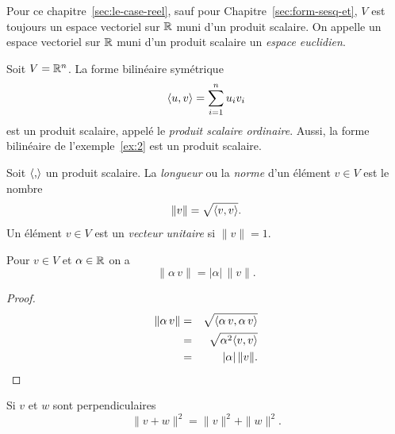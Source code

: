 \begin{framed}\noindent 
  Pour  ce chapitre~\ref{sec:le-case-reel}, sauf pour Chapitre~\ref{sec:form-sesq-et},  $V$
  est toujours un espace vectoriel sur $\mathbb{R}$
  muni d'un produit scalaire. 
On appelle un  espace vectoriel sur $\mathbb{R}$ muni d'un produit scalaire  un \emph{espace euclidien}.  
\end{framed}


\begin{example}
  \label{exe:3}
  Soit $V = \mathbb{R}^n$. La forme bilinéaire symétrique
  \begin{displaymath}
    \langle {u,v} \rangle = \sum_{i=1}^n u_iv_i 
  \end{displaymath}
  est un produit scalaire, appelé le \emph{produit scalaire ordinaire}. 
  Aussi, la forme bilinéaire  de l'exemple~\ref{ex:2} est un produit scalaire. 
\end{example}

\begin{definition}
  \label{def:5}
  Soit $\langle {,} \rangle$ un produit scalaire. La \emph{longueur} ou la \emph{norme} d'un élément $v \in V$ est le nombre 
  \begin{displaymath}
    \| v \| = \sqrt{\langle {v,v} \rangle}.
  \end{displaymath}
  Un élément $v \in V$ est un \emph{vecteur unitaire} si $\|v\| = 1$. 
\end{definition}





\begin{proposition}
  \label{prop:2}
  Pour $v \in V$ et $\alpha \in \mathbb{R}$ on a
  \begin{displaymath}
    \| \alpha \,v \| = |\alpha| \, \|v\|. 
  \end{displaymath}
\end{proposition}



\begin{proof}
  \begin{eqnarray*}    
   \| \alpha \,v \| & = &  \sqrt{\langle {\alpha \, v, \alpha \, v} \rangle } \\
                    & = & \sqrt{\alpha^2 \langle {v,v} \rangle} \\
                    & = & |\alpha | \, \|v\|. 
  \end{eqnarray*}
\end{proof}

\begin{proposition}
\label{prop:4}
Si $v$ et $w$ sont perpendiculaires 
\begin{displaymath}
  \|v+w\|^2 = \|v\|^2 + \|w\|^2. 
\end{displaymath}  
\end{proposition}


